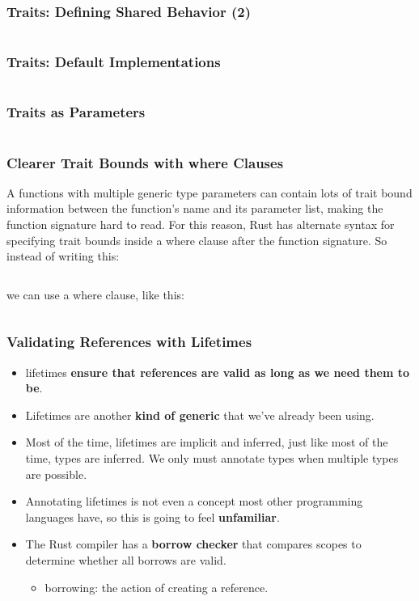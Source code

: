 \documentclass{beamer}
\begin{document}
\begin{frame}[fragile]
	\frametitle{Traits: Defining Shared Behavior (2)}
	\inputminted[fontsize=\scriptsize]{rust}{./code/Trait1.rs}
\end{frame}


\begin{frame}[fragile]
	\frametitle{Traits: Default Implementations}
	\inputminted[fontsize=\scriptsize]{rust}{./code/Trait2.rs}
\end{frame}


\begin{frame}[fragile]
	\frametitle{Traits as Parameters}
	\inputminted{rust}{./code/Trait3.rs}
\end{frame}



\begin{frame}[fragile]
	\frametitle{Clearer Trait Bounds with where Clauses}
	A functions with multiple generic type parameters can contain lots of trait bound information between the function’s name and its parameter list, making the function signature hard to read. For this reason, Rust has alternate syntax for specifying trait bounds inside a where clause after the function signature. So instead of writing this:
	
	\inputminted[fontsize=\scriptsize]{rust}{./code/trait4.rs}
	
	we can use a where clause, like this:
	
	\inputminted[fontsize=\scriptsize]{rust}{./code/trait5.rs}
\end{frame}

\begin{frame}[fragile]
	\frametitle{Validating References with Lifetimes}
	\begin{itemize}
		\item lifetimes \textbf{ensure that references are valid as long as we need them to be}.
		\item 	Lifetimes are another \textbf{kind of generic} that we’ve already been using.
		\item 	Most of the time, lifetimes are implicit and inferred, just like most of the time, types are inferred. We only must annotate types when multiple types are possible.
		\item 	Annotating lifetimes is not even a concept most other programming languages have, so this is going to feel \textbf{unfamiliar}.
		\item The Rust compiler has a\textbf{ borrow checker} that compares scopes to determine whether all borrows are valid.
		\begin{itemize}
			\item borrowing: the action of creating a reference.
		\end{itemize}
	\end{itemize}
\end{frame}
\end{document}
